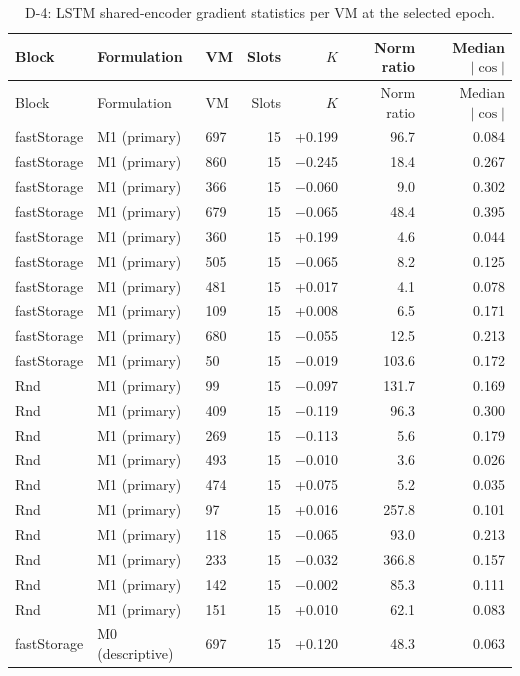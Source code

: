 \documentclass[a4paper,11pt]{article}
\begin{document}
\begin{longtable}{@{}lllrrrr@{}}
\caption{D-4: LSTM shared-encoder gradient statistics per VM at the selected epoch.}\label{tab:supp-t2-d4}\\
\toprule
Block & Formulation & VM & Slots & $K$ & Norm ratio & Median $|\cos|$ \\
\midrule
\endfirsthead
\toprule
Block & Formulation & VM & Slots & $K$ & Norm ratio & Median $|\cos|$ \\
\midrule
\endhead
\bottomrule
\endfoot
fastStorage & M1 (primary) & 697 & 15 & +0.199 & 96.7 & 0.084 \\
fastStorage & M1 (primary) & 860 & 15 & $-$0.245 & 18.4 & 0.267 \\
fastStorage & M1 (primary) & 366 & 15 & $-$0.060 & 9.0 & 0.302 \\
fastStorage & M1 (primary) & 679 & 15 & $-$0.065 & 48.4 & 0.395 \\
fastStorage & M1 (primary) & 360 & 15 & +0.199 & 4.6 & 0.044 \\
fastStorage & M1 (primary) & 505 & 15 & $-$0.065 & 8.2 & 0.125 \\
fastStorage & M1 (primary) & 481 & 15 & +0.017 & 4.1 & 0.078 \\
fastStorage & M1 (primary) & 109 & 15 & +0.008 & 6.5 & 0.171 \\
fastStorage & M1 (primary) & 680 & 15 & $-$0.055 & 12.5 & 0.213 \\
fastStorage & M1 (primary) & 50 & 15 & $-$0.019 & 103.6 & 0.172 \\
Rnd & M1 (primary) & 99 & 15 & $-$0.097 & 131.7 & 0.169 \\
Rnd & M1 (primary) & 409 & 15 & $-$0.119 & 96.3 & 0.300 \\
Rnd & M1 (primary) & 269 & 15 & $-$0.113 & 5.6 & 0.179 \\
Rnd & M1 (primary) & 493 & 15 & $-$0.010 & 3.6 & 0.026 \\
Rnd & M1 (primary) & 474 & 15 & +0.075 & 5.2 & 0.035 \\
Rnd & M1 (primary) & 97 & 15 & +0.016 & 257.8 & 0.101 \\
Rnd & M1 (primary) & 118 & 15 & $-$0.065 & 93.0 & 0.213 \\
Rnd & M1 (primary) & 233 & 15 & $-$0.032 & 366.8 & 0.157 \\
Rnd & M1 (primary) & 142 & 15 & $-$0.002 & 85.3 & 0.111 \\
Rnd & M1 (primary) & 151 & 15 & +0.010 & 62.1 & 0.083 \\
fastStorage & M0 (descriptive) & 697 & 15 & +0.120 & 48.3 & 0.063 \\

\end{longtable}
\end{document}
